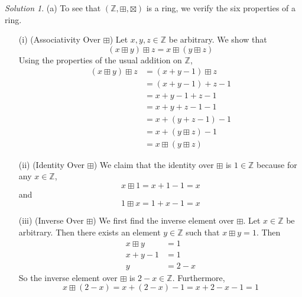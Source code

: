\documentclass[11pt]{amsart}
\theoremstyle{definition}\newtheorem{question}{Question}
\theoremstyle{definition}\newtheorem{claim}{Claim}
\theoremstyle{remark}\newtheorem*{solution}{Solution}
\newcommand{\Z}{\mathbb{Z}}
\begin{document}
\begin{solution}
    (a) To see that $(\Z, \boxplus, \boxtimes)$ is a ring, we verify the six properties of a ring.
    \begin{itemize}
        \item[(i)] (Associativity Over $\boxplus$) Let $x, y, z \in \Z$ be arbitrary. We show that
        \begin{equation*}
            (x \boxplus y) \boxplus z = x \boxplus (y \boxplus z)
        \end{equation*}
        Using the properties of the usual addition on $\Z$,
        \begin{align*}
            (x \boxplus y) \boxplus z &= (x + y - 1) \boxplus z \\
            &= (x + y - 1) + z - 1 \\
            &= x + y - 1 + z - 1 \\
            &= x + y + z - 1 - 1 \\
            &= x + (y + z - 1) - 1 \\
            &= x + (y \boxplus z) - 1 \\
            &= x \boxplus (y \boxplus z)
        \end{align*}
        \item[(ii)] (Identity Over $\boxplus$) We claim that the identity over $\boxplus$ is $1 \in \Z$ because for any $x \in \Z$,
        \begin{equation*}
            x \boxplus 1 = x + 1 - 1 = x
        \end{equation*}
        and
        \begin{equation*}
            1 \boxplus x = 1 + x - 1 = x
        \end{equation*}
        \item[(iii)] (Inverse Over $\boxplus$) We first find the inverse element over $\boxplus$. Let $x \in \Z$ be arbitrary. Then there exists an element $y \in \Z$ such that $x \boxplus y = 1$. Then
        \begin{align*}
            x \boxplus y &= 1 \\
            x + y - 1 &= 1 \\
            y &= 2 - x
        \end{align*}
        So the inverse element over $\boxplus$ is $2 - x \in \Z$. Furthermore,
        \begin{equation*}
            x \boxplus (2 - x) = x + (2 - x) - 1 = x + 2 - x - 1 = 1
        \end{equation*}

\end{itemize}
\end{solution}
\end{document}
